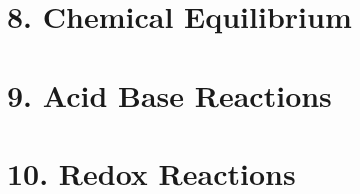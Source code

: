 \documentclass{cheatsheet}
\begin{document}
\section{8. Chemical Equilibrium}
	

\section{9. Acid Base Reactions}
	

\section{10. Redox Reactions}
	
\end{document}
